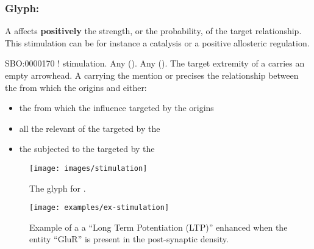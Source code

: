 
\subsubsection{Glyph: }\label{sec:stimulation}

A  affects \textbf{positively} the strength, or the probability, of the target relationship. This stimulation can be for instance a catalysis or a positive allosteric regulation.

\begin{glyphDescription}
 \glyphSboTerm SBO:0000170 ! stimulation.
 \glyphOrigin Any  ().
 \glyphTarget Any  ().
 \glyphEndPoint The target extremity of a  carries an empty arrowhead.
 \glyphAux A  carrying the mention  or  precises the relationship between the  from which the  origins and either:
\begin{itemize}
\item the  from which the influence targeted by the  origins
\item all the relevant  of the  targeted by the 
\item the  subjected to the  targeted by the 
\end{itemize}
 \end{glyphDescription}

\begin{figure}[H]
  \centering
  \texttt{[image: images/stimulation]}
  \caption{The \ER glyph for .}
  \label{fig:stimulation}
\end{figure}

\begin{figure}[H]
  \centering
  \texttt{[image: examples/ex-stimulation]}
  \caption{Example of a  a  ``Long Term Potentiation (LTP)'' enhanced when the entity ``GluR'' is present in the post-synaptic density.}
  \label{fig:ex-stimulation}
\end{figure}

\normalcolor



